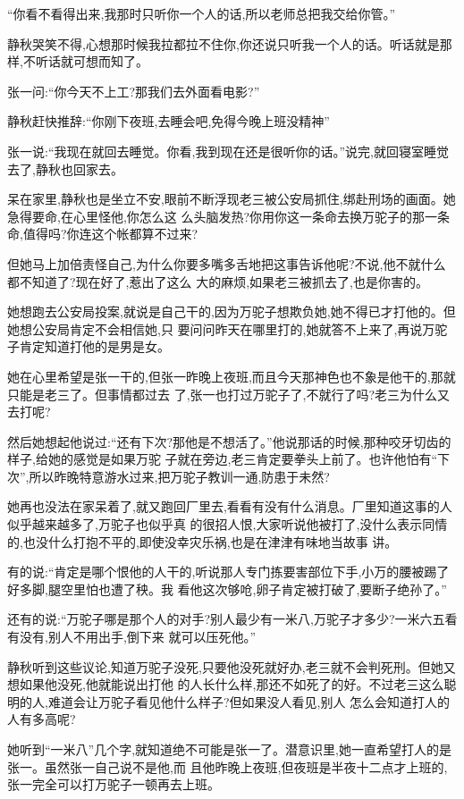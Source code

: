 ﻿\documentclass[12pt]{article}
\begin{document}
``你看不看得出来,我那时只听你一个人的话,所以老师总把我交给你管。''

静秋哭笑不得,心想那时候我拉都拉不住你,你还说只听我一个人的话。听话就是那样,不听话就可想而知了。

张一问:``你今天不上工?那\myrule 我们去\myrule 外面看电影?''

静秋赶快推辞:``你刚下夜班,去睡会吧,免得今晚上班没精神\myrule ''

张一说:``我现在就回去睡觉。你看,我到现在还是很听你的话。''说完,就回寝室睡觉去了,静秋也回家去。

呆在家里,静秋也是坐立不安,眼前不断浮现老三被公安局抓住,绑赴刑场的画面。她急得要命,在心里怪他,你怎么这
么头脑发热?你用你这一条命去换万驼子的那一条命,值得吗?你连这个帐都算不过来?

但她马上加倍责怪自己,为什么你要多嘴多舌地把这事告诉他呢?不说,他不就什么都不知道了?现在好了,惹出了这么
大的麻烦,如果老三被抓去了,也是你害的。

她想跑去公安局投案,就说是自己干的,因为万驼子想欺负她,她不得已才打他的。但她想公安局肯定不会相信她,只
要问问昨天在哪里打的,她就答不上来了,再说万驼子肯定知道打他的是男是女。

她在心里希望是张一干的,但张一昨晚上夜班,而且今天那神色也不象是他干的,那就只能是老三了。但事情都过去
了,张一也打过万驼子了,不就行了吗?老三为什么又去打呢?

然后她想起他说过:``还有下次?那他是不想活了。''他说那话的时候,那种咬牙切齿的样子,给她的感觉是如果万驼
子就在旁边,老三肯定要拳头上前了。也许他怕有``下次'',所以昨晚特意游水过来,把万驼子教训一通,防患于未然?

她再也没法在家呆着了,就又跑回厂里去,看看有没有什么消息。厂里知道这事的人似乎越来越多了,万驼子也似乎真
的很招人恨,大家听说他被打了,没什么表示同情的,也没什么打抱不平的,即使没幸灾乐祸,也是在津津有味地当故事
讲。

有的说:``肯定是哪个恨他的人干的,听说那人专门拣要害部位下手,小万的腰被踢了好多脚,腿空里怕也遭了秧。我
看他这次够呛,卵子肯定被打破了,要断子绝孙了。''

还有的说:``万驼子哪是那个人的对手?别人最少有一米八,万驼子才多少?一米六五看有没有,别人不用出手,倒下来
就可以压死他。''

静秋听到这些议论,知道万驼子没死,只要他没死就好办,老三就不会判死刑。但她又想如果他没死,他就能说出打他
的人长什么样,那还不如死了的好。不过老三这么聪明的人,难道会让万驼子看见他什么样子?但如果没人看见,别人
怎么会知道打人的人有多高呢?

她听到``一米八''几个字,就知道绝不可能是张一了。潜意识里,她一直希望打人的是张一。虽然张一自己说不是他,而
且他昨晚上夜班,但夜班是半夜十二点才上班的,张一完全可以打万驼子一顿再去上班。
\end{document}
